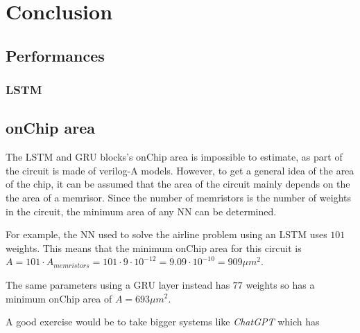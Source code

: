 \section{Conclusion}\label{sec:conc}

\subsection{Performances}

\subsubsection{\ac{LSTM}}

\subsection{onChip area}

The \ac{LSTM} and \ac{GRU} blocks's onChip area is impossible to estimate, as part of the circuit is made of verilog-A models. However, to get a general idea of the area of the chip, it can be assumed that the area of the circuit mainly depends on the the area of a memrisor. Since the number of memristors is the number of weights in the circuit, the minimum area of any \ac{NN} can be determined.

For example, the \ac{NN} used to solve the airline problem using an \ac{LSTM} uses $101$ weights. This means that the minimum onChip area for this circuit is $A=101\cdot A_{memristors} = 101\cdot 9\cdot 10^{-12} = 9.09 \cdot 10^{-10} = 909 \mu m^2$.

The same parameters using a \ac{GRU} layer instead has $77$ weights so has a minimum onChip area of $A=693\mu m^2$.

A good exercise would be to take bigger systems like \textit{ChatGPT} which has
